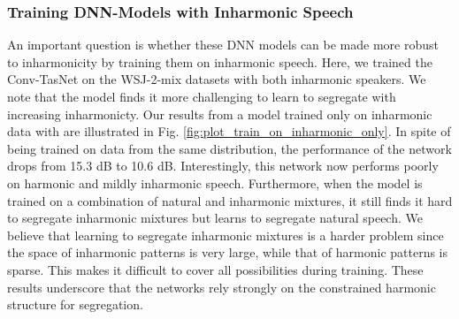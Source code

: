 \documentclass{article}
\begin{document}
\subsubsection{Training DNN-Models with Inharmonic Speech}
\vspace*{-1mm}
\begin{comment}
An important question is whether these DNN models can be made more robust to inharmonicity by training them on inharmonic speech. Here, we trained the Conv-TasNet on the WSJ-2-mix datasets with both inharmonic speakers. We note that the model finds it more challenging to learn to perform segregation with increasing inharmonicty. Our results from a model trained only on inharmonic data with  are illustrated in Fig. \ref{fig:plot_train_on_inharmonic_only}. In spite of being trained on data from the same distribution, the performance of the network drops from 15.3 dB to 10.6 dB, indicating that \textit{out-of-distribution} data is not the key reason for the degradation illustrated in Fig. \ref{fig:plot_trained_net}. More importantly, this network now performs poorly on harmonic and mildly inharmonic speech. Furthermore, when the model is trained on a combination of natural and inharmonic mixtures, it still finds it hard to segregate inharmonic mixtures but learns to segregate natural speech. These results underscore that the networks rely fundamentally on harmonicity.
\end{comment}
An important question is whether these DNN models can be made more robust to inharmonicity by training them on inharmonic speech. Here, we trained the Conv-TasNet on the WSJ-2-mix datasets with both inharmonic speakers. We note that the model finds it more challenging to learn to segregate with increasing inharmonicty. Our results from a model trained only on inharmonic data with  are illustrated in Fig. \ref{fig:plot_train_on_inharmonic_only}. In spite of being trained on data from the same distribution, the performance of the network drops from 15.3 dB to 10.6 dB. Interestingly, this network now performs poorly on harmonic and mildly inharmonic speech. Furthermore, when the model is trained on a combination of natural and inharmonic mixtures, it still finds it hard to segregate inharmonic mixtures but learns to segregate natural speech. We believe that learning to segregate inharmonic mixtures is a harder problem since the space of inharmonic patterns is very large, while that of harmonic patterns is sparse. This makes it difficult to cover all possibilities during training. These results underscore that the networks rely strongly on the constrained harmonic structure for segregation.
\end{document}
